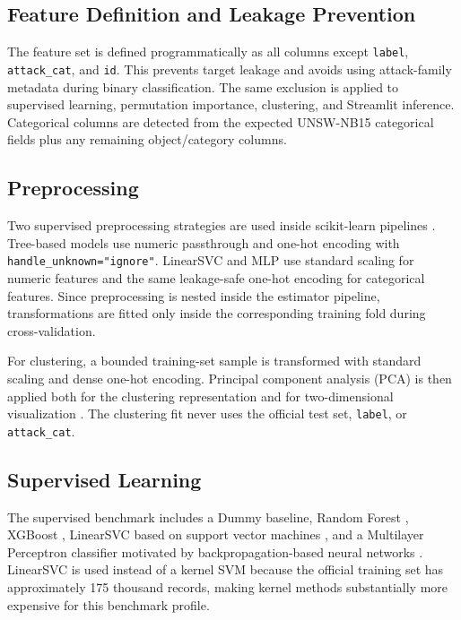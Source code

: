 \documentclass[conference]{IEEEtran}
\begin{document}
\subsection{Feature Definition and Leakage Prevention}
The feature set is defined programmatically as all columns except \texttt{label}, \texttt{attack\_cat}, and \texttt{id}. This prevents target leakage and avoids using attack-family metadata during binary classification. The same exclusion is applied to supervised learning, permutation importance, clustering, and Streamlit inference. Categorical columns are detected from the expected UNSW-NB15 categorical fields plus any remaining object/category columns.

\subsection{Preprocessing}
Two supervised preprocessing strategies are used inside scikit-learn pipelines \cite{pedregosa2011scikit}. Tree-based models use numeric passthrough and one-hot encoding with \texttt{handle\_unknown="ignore"}. LinearSVC and MLP use standard scaling for numeric features and the same leakage-safe one-hot encoding for categorical features. Since preprocessing is nested inside the estimator pipeline, transformations are fitted only inside the corresponding training fold during cross-validation.

For clustering, a bounded training-set sample is transformed with standard scaling and dense one-hot encoding. Principal component analysis (PCA) is then applied both for the clustering representation and for two-dimensional visualization \cite{jolliffe2002pca}. The clustering fit never uses the official test set, \texttt{label}, or \texttt{attack\_cat}.

\subsection{Supervised Learning}
The supervised benchmark includes a Dummy baseline, Random Forest \cite{breiman2001random}, XGBoost \cite{chen2016xgboost}, LinearSVC based on support vector machines \cite{cortes1995svm}, and a Multilayer Perceptron classifier motivated by backpropagation-based neural networks \cite{rumelhart1986learning}. LinearSVC is used instead of a kernel SVM because the official training set has approximately 175 thousand records, making kernel methods substantially more expensive for this benchmark profile.
\end{document}
